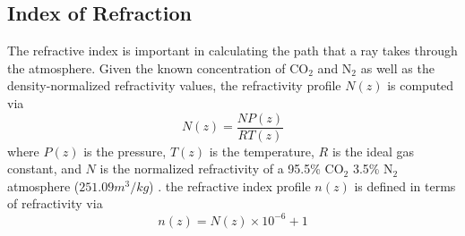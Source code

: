 \subsection{Index of Refraction}
The refractive index is important in calculating the path that a ray takes through the atmosphere. Given the known concentration of CO$_2$ and N$_2$ as well as the density-normalized refractivity values, the refractivity profile $N(z)$ is computed via
\begin{equation}
N(z) = \frac{NP(z)}{RT(z)}
\end{equation}
where $P(z)$ is the pressure, $T(z)$ is the temperature, $R$ is the ideal gas constant, and $N$ is the normalized refractivity of a 95.5\% CO$_2$ 3.5\% N$_2$ atmosphere ($251.09 m^3/kg$) \cite{Essen-1951}. the refractive index profile $n(z)$ is defined in terms of refractivity via
\begin{equation}
n(z) =  N(z) \times 10^{-6} +1
\end{equation}
